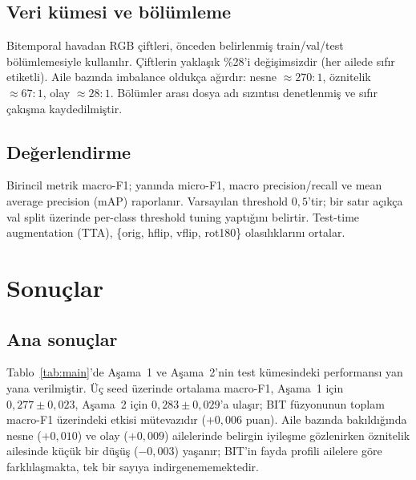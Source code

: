 \documentclass[conference]{IEEEtran}
\begin{document}
\subsection{Veri kümesi ve bölümleme}
Bitemporal havadan RGB çiftleri, önceden belirlenmiş train/val/test bölümlemesiyle kullanılır. Çiftlerin yaklaşık \%28'i değişimsizdir (her ailede sıfır etiketli). Aile bazında imbalance oldukça ağırdır: nesne $\approx 270{:}1$, öznitelik $\approx 67{:}1$, olay $\approx 28{:}1$. Bölümler arası dosya adı sızıntısı denetlenmiş ve sıfır çakışma kaydedilmiştir.

\subsection{Değerlendirme}
Birincil metrik macro-F1; yanında micro-F1, macro precision/recall ve mean average precision (mAP) raporlanır. Varsayılan threshold $0{,}5$'tir; bir satır açıkça val split üzerinde per-class threshold tuning yaptığını belirtir. Test-time augmentation (TTA), \{orig, hflip, vflip, rot180\} olasılıklarını ortalar.

\section{Sonuçlar}

\subsection{Ana sonuçlar}


Tablo~\ref{tab:main}'de Aşama~1 ve Aşama~2'nin test kümesindeki performansı yan yana verilmiştir. Üç seed üzerinde ortalama macro-F1, Aşama~1 için $0{,}277 \pm 0{,}023$, Aşama~2 için $0{,}283 \pm 0{,}029$'a ulaşır; BIT füzyonunun toplam macro-F1 üzerindeki etkisi mütevazıdır ($+0{,}006$ puan). Aile bazında bakıldığında nesne ($+0{,}010$) ve olay ($+0{,}009$) ailelerinde belirgin iyileşme gözlenirken öznitelik ailesinde küçük bir düşüş ($-0{,}003$) yaşanır; BIT'in fayda profili ailelere göre farklılaşmakta, tek bir sayıya indirgenememektedir.


\end{document}
